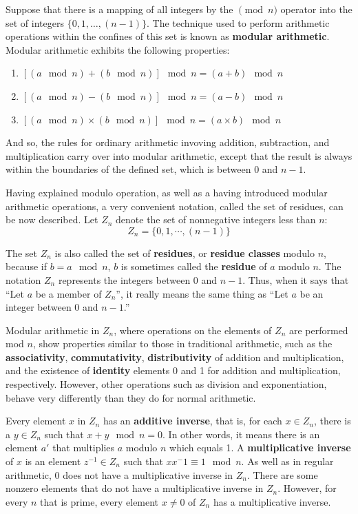 Suppose that there is a mapping of all integers by the $\pmod n$ operator into the set of integers $\{0, 1, \dots, (n-1)\}$. The technique used to perform arithmetic operations within the confines of this set is known as \textbf{modular arithmetic}. Modular arithmetic exhibits the following properties:

\begin{enumerate}
\item $[(a \mod n) + (b \mod n)] \mod n = (a + b) \mod n$
\item $[(a \mod n) - (b \mod n)] \mod n = (a - b) \mod n$
\item $[(a \mod n) \times (b \mod n)] \mod n = (a \times b) \mod n$
\end{enumerate}
And so, the rules for ordinary arithmetic invoving addition, subtraction, and multiplication carry over into modular arithmetic, except that the result is always within the boundaries of the defined set, which is between 0 and $n-1$.

Having explained modulo operation, as well as a having introduced modular arithmetic operations, a very convenient notation, called the set of residues, can be now described. Let $Z_{n}$ denote the set of nonnegative integers less than $n$:
\[
Z_{n} = \{0,1,\cdots, (n-1)\}
\]

The set $Z_{n}$ is also called the set of \textbf{residues}, or \textbf{residue classes} modulo $n$, because if $b=a \mod n$, $b$ is sometimes called the \textbf{residue} of $a$ modulo $n$. The notation $Z_{n}$ represents the integers between 0 and $n-1$. Thus, when it says that ``Let $a$ be a member of $Z_{n}$'', it really means the same thing as ``Let $a$ be an integer between 0 and $n-1$.''

Modular arithmetic in $Z_{n}$, where operations on the elements of $Z_{n}$ are performed mod $n$, show properties similar to those in traditional arithmetic, such as the \textbf{associativity}, \textbf{commutativity}, \textbf{distributivity} of addition and multiplication, and the existence of \textbf{identity} elements 0 and 1 for addition and multiplication, respectively. However, other operations such as division and exponentiation, behave very differently than they do for normal arithmetic. 

Every element $x$ in $Z_{n}$ has an \textbf{additive inverse}, that is, for each $x \in Z_{n}$, there is a $y \in Z_{n}$ such that $x + y \mod n = 0$. In other words, it means there is an element $a'$ that multiplies $a$ modulo $n$ which equals 1.  A \textbf{multiplicative inverse} of $x$ is an element $z^{-1} \in Z_{n}$ such that $xx^-1 \equiv 1 \mod n$. As well as in regular arithmetic, 0 does not have a multiplicative inverse in $Z_{n}$. There are some nonzero elements that do not have a multiplicative inverse in $Z_{n}$. However, for every $n$ that is prime, every element $x \ne 0$ of $Z_{n}$ has a multiplicative inverse.


